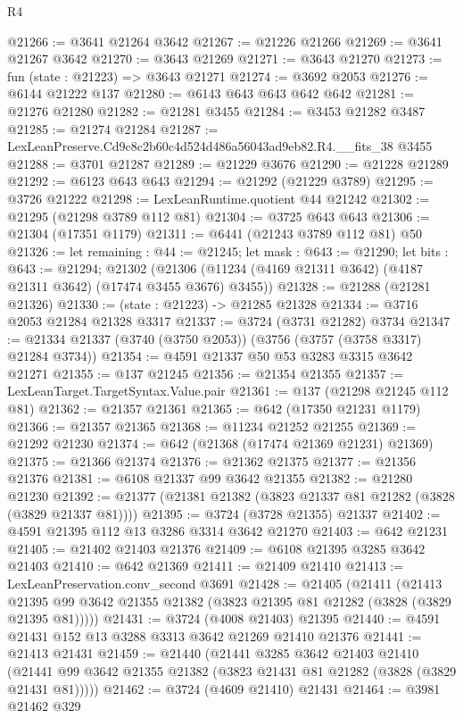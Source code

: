 \begin{lexlean}{R4}
\begin{coremodule}
@21266 := @3641 @21264 @3642
@21267 := @21226 @21266
@21269 := @3641 @21267 @3642
@21270 := @3643 @21269
@21271 := @3643 @21270
@21273 := fun (state : @21223) => @3643 @21271
@21274 := @3692 @2053
@21276 := @6144 @21222 @137
@21280 := @6143 @643 @643 @642 @642
@21281 := @21276 @21280
@21282 := @21281 @3455
@21284 := @3453 @21282 @3487
@21285 := @21274 @21284
@21287 := LexLeanPreserve.Cd9c8c2b60c4d524d486a56043ad9eb82.R4.__fits_38 @3455
@21288 := @3701 @21287
@21289 := @21229 @3676
@21290 := @21228 @21289
@21292 := @6123 @643 @643
@21294 := @21292 (@21229 @3789)
@21295 := @3726 @21222
@21298 := LexLeanRuntime.quotient @44 @21242
@21302 := @21295 (@21298 @3789 @112 @81)
@21304 := @3725 @643 @643
@21306 := @21304 (@17351 @1179)
@21311 := @6441 (@21243 @3789 @112 @81) @50
@21326 := let remaining : @44 := @21245;
  let mask : @643 := @21290;
  let bits : @643 := @21294;
  @21302 (@21306 (@11234 (@4169 @21311 @3642) (@4187 @21311 @3642) (@17474 @3455 @3676) @3455))
@21328 := @21288 (@21281 @21326)
@21330 := (state : @21223) -> @21285 @21328
@21334 := @3716 @2053 @21284 @21328 @3317
@21337 := @3724 (@3731 @21282) @3734
@21347 := @21334 @21337 (@3740 (@3750 @2053)) (@3756 (@3757 (@3758 @3317) @21284 @3734))
@21354 := @4591 @21337 @50 @53 @3283 @3315 @3642 @21271
@21355 := @137 @21245
@21356 := @21354 @21355
@21357 := LexLeanTarget.TargetSyntax.Value.pair
@21361 := @137 (@21298 @21245 @112 @81)
@21362 := @21357 @21361
@21365 := @642 (@17350 @21231 @1179)
@21366 := @21357 @21365
@21368 := @11234 @21252 @21255
@21369 := @21292 @21230
@21374 := @642 (@21368 (@17474 @21369 @21231) @21369)
@21375 := @21366 @21374
@21376 := @21362 @21375
@21377 := @21356 @21376
@21381 := @6108 @21337 @99 @3642 @21355
@21382 := @21280 @21230
@21392 := @21377 (@21381 @21382 (@3823 @21337 @81 @21282 (@3828 (@3829 @21337 @81))))
@21395 := @3724 (@3728 @21355) @21337
@21402 := @4591 @21395 @112 @13 @3286 @3314 @3642 @21270
@21403 := @642 @21231
@21405 := @21402 @21403 @21376
@21409 := @6108 @21395 @3285 @3642 @21403
@21410 := @642 @21369
@21411 := @21409 @21410
@21413 := LexLeanPreservation.conv_second @3691
@21428 := @21405
    (@21411
      (@21413 @21395 @99 @3642 @21355 @21382 (@3823 @21395 @81 @21282 (@3828 (@3829 @21395 @81)))))
@21431 := @3724 (@4008 @21403) @21395
@21440 := @4591 @21431 @152 @13 @3288 @3313 @3642 @21269 @21410 @21376
@21441 := @21413 @21431
@21459 := @21440
    (@21441
      @3285
      @3642
      @21403
      @21410
      (@21441 @99 @3642 @21355 @21382 (@3823 @21431 @81 @21282 (@3828 (@3829 @21431 @81)))))
@21462 := @3724 (@4609 @21410) @21431
@21464 := @3981 @21462 @329

\end{coremodule}
\end{lexlean}
